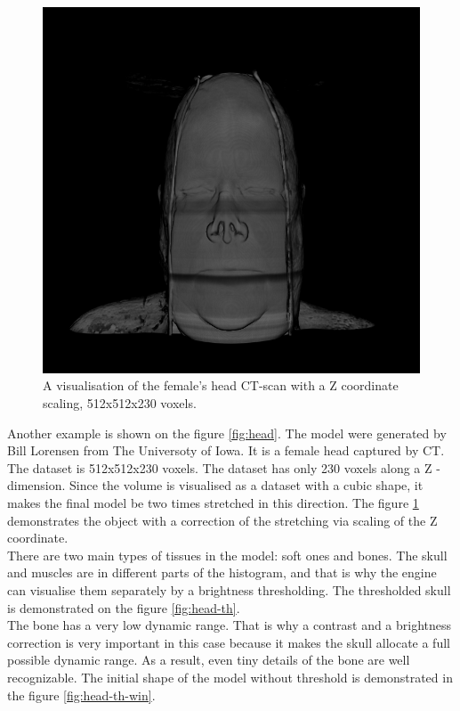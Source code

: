 \documentclass[twoside, english, 11pt]{report}
\begin{document}
\begin{figure}[H]
\centerline{\includegraphics[scale = 0.55]{img/head-zcor}}
\caption{A visualisation of the female's head CT-scan with a Z coordinate scaling, 512x512x230 voxels.\label{fig:head-zcor}}
\end{figure}
Another example is shown on the figure \ref{fig:head}. The model were generated by Bill Lorensen from The Universoty of Iowa. It is a female head captured by CT. The dataset is 512x512x230 voxels. The dataset has only 230 voxels along a Z - dimension. Since the volume is visualised as a dataset with a cubic shape, it makes the final model be two times stretched in this direction. The figure \ref{fig:head-zcor} demonstrates the object with a correction of the stretching via scaling of the Z coordinate.\\

There are two main types of tissues in the model: soft ones and bones. The skull and muscles are in different parts of the histogram, and that is why the engine can visualise them separately by a brightness thresholding. The thresholded skull is demonstrated on the figure \ref{fig:head-th}.\\

The bone has a very low dynamic range. That is why a contrast and a brightness correction is very important in this case because it makes the skull allocate a full possible dynamic range. As a result, even tiny details of the bone are well recognizable. The initial shape of the model without threshold is demonstrated in the figure \ref{fig:head-th-win}. \\
\end{document}
